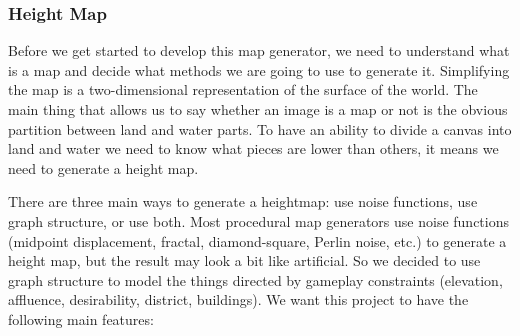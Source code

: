 \subsubsection{Height Map}
\label{sec:Design>Map Generator Design>Height Map}
Before we get started to develop this map generator, we need to understand what is a map and decide what methods we are going to use to generate it. Simplifying the map is a two-dimensional representation of the surface of the world.
The main thing that allows us to say whether an image is a map or not is the obvious partition between land and water parts. To have an ability to divide a canvas into land and water we need to know what pieces are lower than others, it means we need to generate a height map.

There are three main ways to generate a heightmap: use noise functions, use graph structure, or use both. Most procedural map generators use noise functions (midpoint displacement, fractal, diamond-square, Perlin noise, etc.) to generate a height map, but the result may look a bit like artificial. So we decided to use graph structure to model the things directed by gameplay constraints (elevation, affluence, desirability, district, buildings). We want this project to have the following main features:

